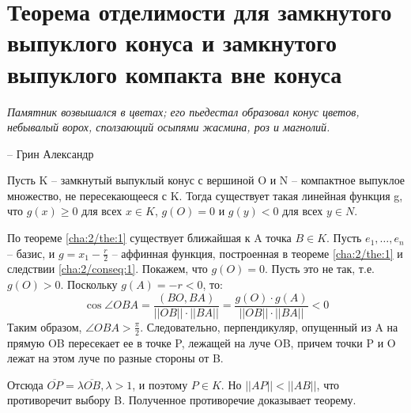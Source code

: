 \chapter{Теорема отделимости для замкнутого выпуклого конуса и замкнутого выпуклого компакта вне конуса}
\label{cha:4}

\epigraph{
	\textit{Памятник возвышался в цветах; его пьедестал образовал конус цветов, небывалый ворох, сползающий осыпями жасмина, роз и магнолий.}}
{-- Грин Александр}

\begin{theorem}[]\label{cha:4/the:1}
	Пусть K – замкнутый выпуклый конус с вершиной O и N – компактное выпуклое множество, не пересекающееся с K. Тогда существует такая линейная функция g, что $g(x) \ge 0$ для всех $x \in K$, $g(O) = 0$ и $g(y) < 0$ для всех $y \in N$.
\end{theorem}
\begin{Proof}
	По теореме \ref{cha:2/the:1} существует ближайшая к A точка $B\in K$. Пусть $e_1, \dots, e_n$ – базис, и $g = x_1 − \frac{r}{2}$ – аффинная функция, построенная в теореме \ref{cha:2/the:1} и следствии \ref{cha:2/conseq:1}. Покажем, что $g(O) = 0$. Пусть это не так, т.е. $g(O) > 0$. Поскольку $g(A) = −r < 0$, то:
	$$\cos \angle OBA = \frac{\left( BO, BA \right)}{||OB||\cdot ||BA||} = \frac{g(O) \cdot g(A)}{||OB|| \cdot ||BA||} < 0$$
	Таким образом, $\angle OBA > \frac{\pi}{2}$. Следовательно, перпендикуляр, опущенный из A на прямую OB пересекает ее в точке P, лежащей на луче OB, причем точки P и O лежат на этом луче по разные стороны от B.

	Отсюда $\overline{OP} = \lambda \overline{OB}, \lambda > 1$, и поэтому $P \in K$. Но $||AP||<||AB||$, что противоречит выбору B. Полученное противоречие доказывает теорему.
\end{Proof}
